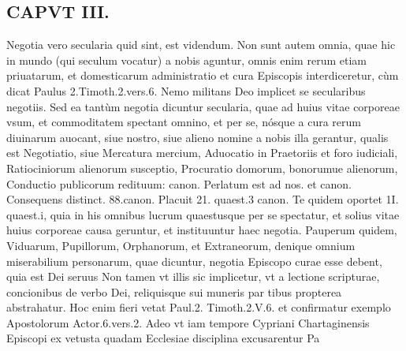 \documentclass{article}
\begin{document}
\begin{pages}
\section*{CAPVT  III. }
\marginpar{[ p.149 ]}\pstart Negotia vero secularia quid sint, est videndum. Non sunt autem omnia, quae hic in mundo (qui seculum vocatur) a nobis aguntur, omnis enim rerum etiam priuatarum, et domesticarum administratio et cura Episcopis interdiceretur, cùm dicat Paulus 2.Timoth.2.vers.6. Nemo militans Deo implicet se secularibus negotiis. Sed ea tantùm negotia dicuntur secularia, quae ad huius vitae corporeae vsum, et commoditatem spectant omnino, et per se, nósque a cura rerum diuinarum auocant, siue nostro, siue alieno nomine a nobis illa gerantur, qualis est Negotiatio, siue Mercatura mercium, Aduocatio in Praetoriis et foro iudiciali, Ratiociniorum alienorum susceptio, Procuratio domorum, bonorumue alienorum, Conductio publicorum redituum: canon. Perlatum est ad nos. et canon. Consequens distinct. 88.canon. Placuit 21. quaest.3 canon. Te quidem oportet 1I. quaest.i, quia in his omnibus lucrum quaestusque per se spectatur, et solius vitae huius corporeae causa geruntur, et instituuntur haec negotia.  \pend\pstart Pauperum quidem, Viduarum, Pupillorum, Orphanorum, et Extraneorum, denique omnium miserabilium personarum, quae dicuntur, negotia Episcopo curae esse debent, quia est Dei seruus Non tamen vt illis sic implicetur, vt a lectione scripturae, concionibus de verbo Dei, reliquisque  sui muneris par tibus propterea abstrahatur. Hoc enim fieri vetat Paul.2. Timoth.2.V.6. et confirmatur exemplo Apostolorum Actor.6.vers.2. Adeo vt iam tempore Cypriani Chartaginensis Episcopi ex vetusta quadam Ecclesiae disciplina excusarentur Pa\pend

\end{pages}
\end{document}
